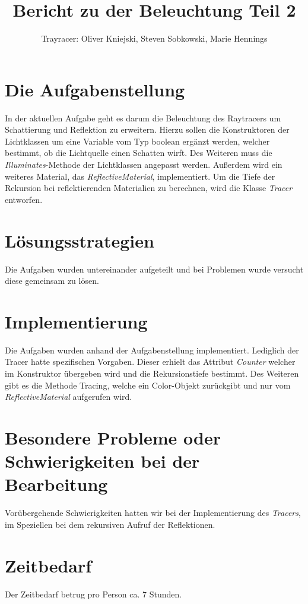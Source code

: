 \documentclass[a4paper,parskip=half,11pt]{scrartcl}
\author{Trayracer: Oliver Kniejski, Steven Sobkowski, Marie Hennings}
\title{Bericht zu der Beleuchtung Teil 2}
\begin{document}
 
\maketitle

\section*{Die Aufgabenstellung}
In der aktuellen Aufgabe geht es darum die Beleuchtung des Raytracers um Schattierung und Reflektion zu erweitern. 
Hierzu sollen die Konstruktoren der Lichtklassen um eine Variable vom Typ boolean ergänzt werden, welcher bestimmt, ob die Lichtquelle einen Schatten wirft.
Des Weiteren muss die \emph{Illuminates}-Methode der Lichtklassen angepasst werden.
Außerdem wird ein weiteres Material, das \emph{ReflectiveMaterial}, implementiert. 
Um die Tiefe der Rekursion bei reflektierenden Materialien zu berechnen, wird die Klasse \emph{Tracer} entworfen.

\section*{Lösungsstrategien}
Die Aufgaben wurden untereinander aufgeteilt und bei Problemen wurde versucht diese gemeinsam zu lösen.


\section*{Implementierung}
Die Aufgaben wurden anhand der Aufgabenstellung implementiert. Lediglich der Tracer hatte spezifischen Vorgaben. Dieser erhielt das Attribut \emph{Counter} welcher im Konstruktor übergeben wird und die Rekursionstiefe bestimmt. Des Weiteren gibt es die Methode Tracing, welche ein Color-Objekt zurückgibt und nur vom \emph{ReflectiveMaterial} aufgerufen wird.

\section*{Besondere Probleme oder Schwierigkeiten bei der Bearbeitung}
Vorübergehende Schwierigkeiten hatten wir bei der Implementierung des \emph{Tracers}, im Speziellen bei dem rekursiven Aufruf der Reflektionen.

\section*{Zeitbedarf}
Der Zeitbedarf betrug pro Person ca. 7 Stunden.
\end{document}
